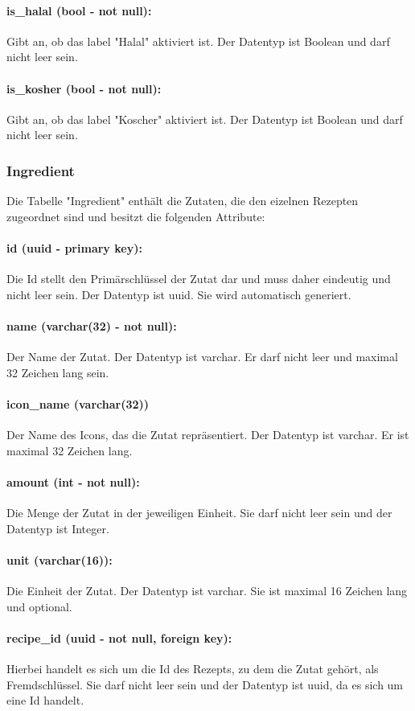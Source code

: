 \documentclass[parskip=full]{scrartcl}
\begin{document}
\paragraph{is\_halal (bool - not null):} Gibt an, ob das \Gls{label} "Halal" aktiviert ist. Der Datentyp ist Boolean und darf nicht leer sein.
\paragraph{is\_kosher (bool - not null):} Gibt an, ob das \Gls{label} "Koscher" aktiviert ist. Der Datentyp ist Boolean und darf nicht leer sein.
\newpage
\subsubsection{Ingredient}
Die Tabelle "Ingredient" enthält die Zutaten, die den eizelnen Rezepten zugeordnet sind und besitzt die folgenden Attribute:
\paragraph{id (uuid - primary key):} Die Id stellt den Primärschlüssel der Zutat dar und muss daher eindeutig und nicht leer sein. Der Datentyp ist \Gls{uuid}. Sie wird automatisch generiert.
\paragraph{name (varchar(32) - not null):} Der Name der Zutat. Der Datentyp ist \Gls{varchar}. Er darf nicht leer und maximal 32 Zeichen lang sein.
\paragraph{icon\_name (varchar(32))} Der Name des Icons, das die Zutat repräsentiert. Der Datentyp ist \Gls{varchar}. Er ist maximal 32 Zeichen lang.
\paragraph{amount (int - not null):} Die Menge der Zutat in der jeweiligen Einheit. Sie darf nicht leer sein und der Datentyp ist Integer.
\paragraph{unit (varchar(16)):} Die Einheit der Zutat. Der Datentyp ist \Gls{varchar}. Sie ist maximal 16 Zeichen lang und optional.
\paragraph{recipe\_id (uuid - not null, foreign key):} Hierbei handelt es sich um die Id des Rezepts, zu dem die Zutat gehört, als Fremdschlüssel. Sie darf nicht leer sein und der Datentyp ist \Gls{uuid}, da es sich um eine Id handelt.
\newpage
\end{document}
